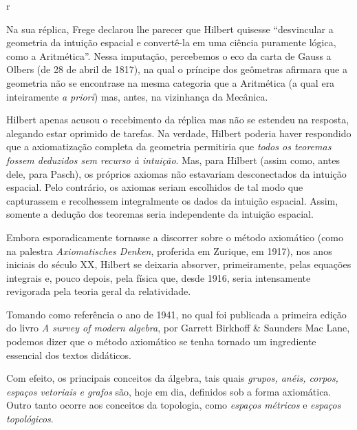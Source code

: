 r\documentclass{hipatia}
\begin{document}
Na sua réplica, Frege declarou lhe parecer que Hilbert quisesse ``desvincular a geometria da intuição espacial e convertê-la em uma ciência puramente lógica, como a Aritmética''. Nessa imputação, percebemos o eco da carta de Gauss a Olbers  (de 28 de abril de 1817), na qual o príncipe dos geômetras afirmara que a geometria não se encontrase na mesma categoria que a Aritmética  (a qual era inteiramente \emph{a priori})  mas, antes, na vizinhança da Mecânica. \cite[p. 117]{corry1997a}\cite[p. 113]{mosterin1984}\cite[p. 382]{belna2002}  

Hilbert apenas acusou o recebimento da réplica mas não se estendeu na resposta, alegando estar oprimido de tarefas. Na verdade, Hilbert poderia haver respondido que a axiomatização completa da geometria permitiria que \emph{todos os teoremas fossem deduzidos sem recurso à intuição}. Mas, para Hilbert (assim como, antes dele, para Pasch), os próprios axiomas não estavariam desconectados da intuição espacial. Pelo contrário, os axiomas seriam escolhidos de tal modo que capturassem e recolhessem integralmente os dados da intuição espacial. Assim, somente a dedução dos teoremas seria independente da intuição espacial. \cite[p. 117]{corry1997a}

Embora esporadicamente tornasse a discorrer sobre o método axiomático (como na palestra \emph{Axiomatisches Denken}, proferida em Zurique, em 1917), nos anos iniciais do século XX, Hilbert se deixaria absorver, primeiramente, pelas equações integrais e, pouco depois, pela física que, desde 1916, seria intensamente revigorada pela teoria geral da relatividade.

Tomando como referência o ano de 1941, no qual foi publicada a primeira edição do livro \emph{A survey of modern algebra}, por Garrett Birkhoff \& Saunders Mac Lane, podemos dizer que o método axiomático se tenha tornado um ingrediente essencial dos textos didáticos.

Com efeito, os principais conceitos da álgebra, tais quais \emph{grupos, anéis, corpos, espaços vetoriais e grafos} são, hoje em dia, definidos sob a forma axiomática. Outro tanto ocorre aos conceitos da topologia, como \emph{espaços métricos} e \emph{espaços topológicos}.
\end{document}
